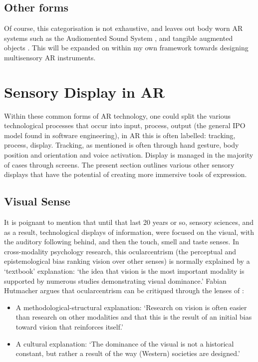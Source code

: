 \subsection{Other forms}\label{sec: ar-forms-other}
Of course, this categorisation is not exhaustive, and leaves out body worn AR systems such as the Audiomented Sound System \citep{chevalier2020}, and tangible augmented objects \citep{schraffenberger2015}. This will be expanded on within my own framework towards designing multisensory AR instruments.



\section{Sensory Display in AR}\label{sec: ar-sensory}
Within these common forms of AR technology, one could split the various technological processes that occur into input, process, output (the general IPO model found in software engineering), in AR this is often labelled: tracking, process, display. Tracking, as mentioned is often through hand gesture, body position and orientation and voice activation. Display is managed in the majority of cases through screens. The present section outlines various other sensory displays that have the potential of creating more immersive tools of expression.

\subsection{Visual Sense}\label{sec: ar-sensory-visual}
It is poignant to mention that until that last 20 years or so, sensory sciences, and as a result, technological displays of information, were focused on the visual, with the auditory following behind, and then the touch, smell and taste senses. In cross-modality psychology research, this ocularcentrism (the perceptual and epistemological bias ranking vision over other senses) is normally explained by a `textbook' explanation: `the idea that vision is the most important modality is supported by numerous studies demonstrating visual dominance.' Fabian Hutmacher argues that ocularcentrism can be critiqued through the lenses of \citeyearpar{hutmacher2019}: 

\begin{itemize}
    \item A methodological-structural explanation: `Research on vision is often easier than research on other modalities and that this is the result of an initial bias toward vision that reinforces itself.'
    \item A cultural explanation: `The dominance of the visual is not a historical constant, but rather a result of the way (Western) societies are designed.'
\end{itemize}

